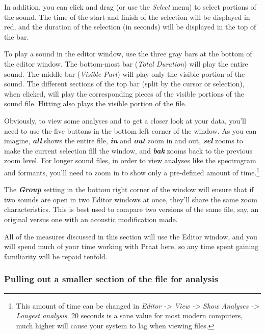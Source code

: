 \documentclass[11pt]{article}
\begin{document}
In addition, you can click and drag (or use the \emph{Select} menu) to
select portions of the sound. The time of the start and finish of the
selection will be displayed in red, and the duration of the selection
(in seconds) will be displayed in the top of the bar.

To play a sound in the editor window, use the three gray bars at the
bottom of the editor window. The bottom-most bar (\emph{Total Duration})
will play the entire sound. The middle bar (\emph{Visible Part}) will
play only the visible portion of the sound. The different sections of
the top bar (split by the cursor or selection), when clicked, will play
the corresponding pieces of the visible portions of the sound file.
Hitting also plays the visible portion of the file.

Obviously, to view some analyses and to get a closer look at your data,
you'll need to use the five buttons in the bottom left corner of the
window. As you can imagine, \textbf{\emph{all}} shows the entire file,
\textbf{\emph{in}} and \textbf{\emph{out}} zoom in and out,
\textbf{\emph{sel}} zooms to make the current selection fill the window,
and \textbf{\emph{bak}} zooms back to the previous zoom level. For
longer sound files, in order to view analyses like the spectrogram and
formants, you'll need to zoom in to show only a pre-defined amount of
time.\footnote{This amount of time can be changed in \textit{Editor -> View -> Show Analyses -> Longest analysis}.  20 seconds is a sane value for most modern computers, much higher will cause your system to lag when viewing files.}

The \textbf{\emph{Group}} setting in the bottom right corner of the
window will ensure that if two sounds are open in two Editor windows at
once, they'll share the same zoom characteristics. This is best used to
compare two versions of the same file, say, an original versus one with
an acoustic modification made.

All of the measures discussed in this section will use the Editor
window, and you will spend much of your time working with Praat here, so
any time spent gaining familiarity will be repaid tenfold.

\hypertarget{pulling-out-a-smaller-section-of-the-file-for-analysis}{%
\subsubsection{Pulling out a smaller section of the file for
analysis}\label{pulling-out-a-smaller-section-of-the-file-for-analysis}}
\end{document}
